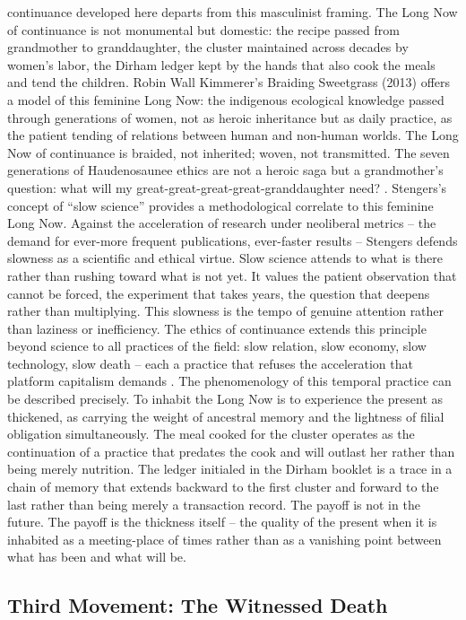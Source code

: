 continuance developed here departs from this masculinist framing. The Long Now of continuance is not monumental but domestic: the recipe passed from grandmother to granddaughter, the cluster maintained across decades by women’s labor, the Dirham ledger kept by the hands that also cook the meals and tend the children. Robin Wall Kimmerer’s Braiding Sweetgrass (2013) offers a model of this feminine Long Now: the indigenous ecological knowledge passed through generations of women, not as heroic inheritance but as daily practice, as the patient tending of relations between human and non-human worlds. The Long Now of continuance is braided, not inherited; woven, not transmitted. The seven generations of Haudenosaunee ethics are not a heroic saga but a grandmother’s question: what will my great-great-great-great-granddaughter need? \cite[pp.~6-10]{kimmerer_2013}. Stengers’s concept of “slow science” provides a methodological correlate to this feminine Long Now. Against the acceleration of research under neoliberal metrics – the demand for ever-more frequent publications, ever-faster results – Stengers defends slowness as a scientific and ethical virtue. Slow science attends to what is there rather than rushing toward what is not yet. It values the patient observation that cannot be forced, the experiment that takes years, the question that deepens rather than multiplying. This slowness is the tempo of genuine attention rather than laziness or inefficiency. The ethics of continuance extends this principle beyond science to all practices of the field: slow relation, slow economy, slow technology, slow death – each a practice that refuses the acceleration that platform capitalism demands \cite[pp.~1-28]{stengers_2018}. The phenomenology of this temporal practice can be described precisely. To inhabit the Long Now is to experience the present as thickened, as carrying the weight of ancestral memory and the lightness of filial obligation simultaneously. The meal cooked for the cluster operates as the continuation of a practice that predates the cook and will outlast her rather than being merely nutrition. The ledger initialed in the Dirham booklet is a trace in a chain of memory that extends backward to the first cluster and forward to the last rather than being merely a transaction record. The payoff is not in the future. The payoff is the thickness itself – the quality of the present when it is inhabited as a meeting-place of times rather than as a vanishing point between what has been and what will be.

\subsection{Third Movement: The Witnessed Death}


